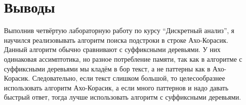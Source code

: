 \section{Выводы}
{\itshape }

Выполнив четвёртую лабораторную работу по курсу \enquote{Дискретный анализ}, я научился реализовывать алгоритм поиска подстроки в строке Ахо-Корасик. Данный алгоритм обычно сравнивают с суффиксными деревьями. У них одинаковая ассимптотика, но разное потребление памяти, так 
как в алгоритме с суффиксными деревьями мы кладём в бор текст, а не паттерны как в Ахо-Корасик. Следовательно, если текст слишком большой, 
то целесообразнее использовать алгоритм Ахо-Корасик, а если много паттернов и надо давать быстрый ответ, тогда лучше использовать алгоритм
с суффиксными деревьями.
\pagebreak
